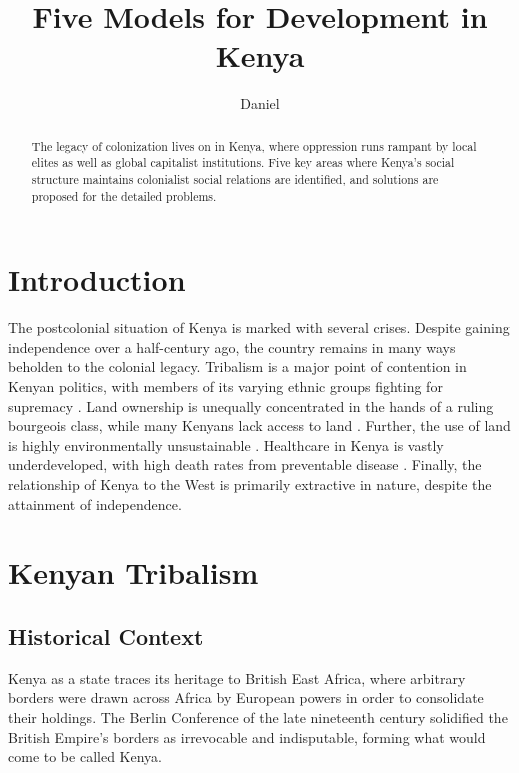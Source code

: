 \documentclass[american]{../../../coursework}
\title{Five Models for Development in Kenya}
\subtitle{}
\author{Daniel}{Glenn}{Leonard}
\date{\displaydate{date}}
\begin{document}
\maketitle

\begin{abstract}
    The legacy of colonization lives on in Kenya, where oppression runs
    rampant by local elites as well as global capitalist institutions. Five
    key areas where Kenya's social structure maintains colonialist social
    relations are identified, and solutions are proposed for the detailed
    problems.
\end{abstract}

\printkeywords

\section{Introduction}

The postcolonial situation of Kenya is marked with several crises. Despite
gaining independence over a half-century ago, the country remains in many ways
beholden to the colonial legacy. Tribalism is a major point of contention in
Kenyan politics, with members of its varying ethnic groups fighting for
supremacy \parencite{Orvis2001}. Land ownership is unequally concentrated in
the hands of a ruling bourgeois class, while many Kenyans lack access to land
\parencite{Syagga2006}. Further, the use of land is highly environmentally
unsustainable \parencite{Syagga2006}. Healthcare in Kenya is vastly
underdeveloped, with high death rates from preventable disease
\parencite{Feikin2011}. Finally, the relationship of Kenya to the West is
primarily extractive in nature, despite the attainment of independence.

\section{Kenyan Tribalism}
\subsection{Historical Context}

Kenya as a state traces its heritage to British East Africa, where arbitrary
borders were drawn across Africa by European powers in order to consolidate
their holdings. The Berlin Conference of the late nineteenth century
solidified the British Empire's borders as irrevocable and indisputable,
forming what would come to be called Kenya.
\end{document}
